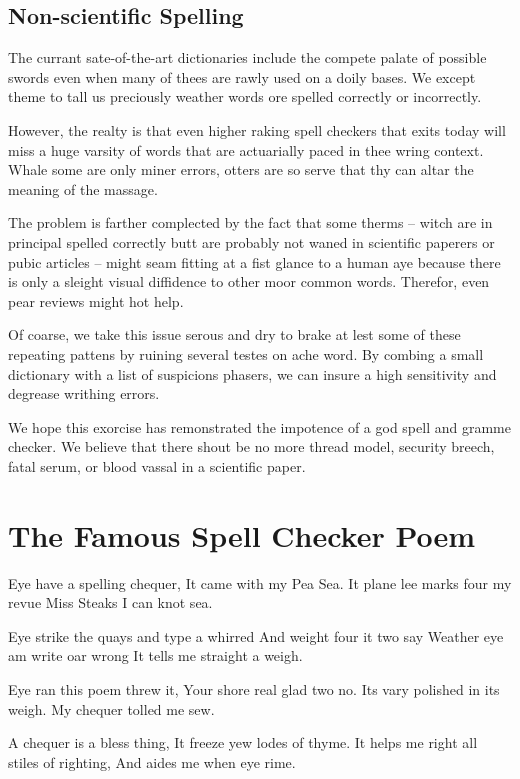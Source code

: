 \documentclass{scrartcl}
\begin{document}
\subsection{Non-scientific Spelling}
The currant sate-of-the-art dictionaries include the compete palate of
possible swords even when many of thees are rawly used on a doily bases. 
We except theme to tall us preciously weather words ore spelled correctly
or incorrectly. 

However, the realty is that even higher raking spell checkers that
exits today will miss a huge varsity of words that are actuarially
paced in thee wring context. Whale some are only miner errors, otters
are so serve that thy can altar the meaning of the massage.

The problem is farther complected by the fact that some therms – 
witch are in principal spelled correctly butt are probably not waned in 
scientific paperers or pubic articles – might seam fitting at a fist glance
to a human aye because there is only a sleight visual diffidence to 
other moor common words. Therefor, even pear reviews might hot help.

Of coarse, we take this issue serous and dry to brake at lest some of 
these repeating pattens by ruining several testes on ache word.
By combing a small dictionary with a list of suspicions phasers, 
we can insure a high sensitivity and degrease writhing errors.

We hope this exorcise has remonstrated the impotence of a god spell
and gramme checker. We believe that there shout be no more thread model,
security breech, fatal serum, or blood vassal in a scientific paper.
 





\section{The Famous Spell Checker Poem}
Eye have a spelling chequer,
It came with my Pea Sea.
It plane lee marks four my revue
Miss Steaks I can knot sea.

Eye strike the quays and type a whirred
And weight four it two say
Weather eye am write oar wrong
It tells me straight a weigh.

Eye ran this poem threw it,
Your shore real glad two no.
Its vary polished in its weigh.
My chequer tolled me sew.

A chequer is a bless thing,
It freeze yew lodes of thyme.
It helps me right all stiles of righting,
And aides me when eye rime.
\end{document}

